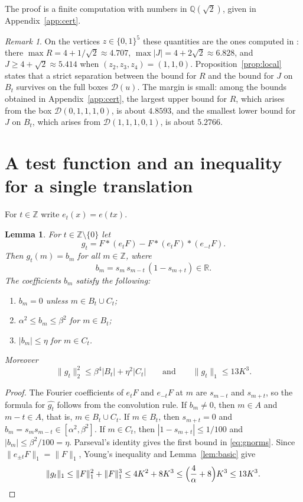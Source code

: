 \documentclass{amsart}
\newtheorem{lemma}[theorem]{Lemma}
\theoremstyle{remark}
\newtheorem{remark}[theorem]{Remark}
\numberwithin{equation}{section}
\numberwithin{table}{section}
\newcommand{\Z}{\mathbb{Z}}
\newcommand{\R}{\mathbb{R}}
\newcommand{\D}{\mathcal{D}}
\begin{document}
The proof is a finite computation with numbers in $\mathbb Q(\sqrt2)$, given in Appendix~\ref{app:cert}.

\begin{remark}
On the vertices $z\in\{0,1\}^5$ these quantities are the ones computed in \cite[Lemma~7.2]{Bed}: there $\max R=4+1/\sqrt2\approx4.707$, $\max|J|=4+2\sqrt2\approx6.828$, and $J\ge4+\sqrt2\approx5.414$ when $(z_2,z_3,z_4)=(1,1,0)$. Proposition~\ref{prop:local} states that a strict separation between the bound for $R$ and the bound for $J$ on $B_t$ survives on the full boxes $\D(u)$. The margin is small: among the bounds obtained in Appendix~\ref{app:cert}, the largest upper bound for $R$, which arises from the box $\D(0,1,1,1,0)$, is about $4.8593$, and the smallest lower bound for $J$ on $B_t$, which arises from $\D(1,1,1,0,1)$, is about $5.2766$.
\end{remark}

\section{A test function and an inequality for a single translation}\label{sec:selector}

For $t\in\Z$ write $e_t(x)=e(tx)$.

\begin{lemma}\label{lem:selector}
For $t\in\Z\setminus\{0\}$ let
\[
g_t=F*(e_tF)-F*(e_tF)*(e_{-t}F).
\]
Then $\widehat{g_t}(m)=b_m$ for all $m\in\Z$, where
\[
b_m=s_m\,s_{m-t}\,(1-s_{m+t})\in\R.
\]
The coefficients $b_m$ satisfy the following:
\begin{enumerate}
\item $b_m=0$ unless $m\in B_t\cup C_t$;
\item $\alpha^2\le b_m\le\beta^2$ for $m\in B_t$;
\item $|b_m|\le\eta$ for $m\in C_t$.
\end{enumerate}
Moreover
\begin{equation}\label{eq:gnorms}
\|g_t\|_2^2\le\beta^4|B_t|+\eta^2|C_t|\qquad\text{and}\qquad\|g_t\|_1\le13K^3.
\end{equation}
\end{lemma}

\begin{proof}
The Fourier coefficients of $e_tF$ and $e_{-t}F$ at $m$ are $s_{m-t}$ and $s_{m+t}$, so the formula for $\widehat{g_t}$ follows from the convolution rule. If $b_m\ne0$, then $m\in A$ and $m-t\in A$, that is, $m\in B_t\cup C_t$. If $m\in B_t$, then $s_{m+t}=0$ and $b_m=s_ms_{m-t}\in[\alpha^2,\beta^2]$. If $m\in C_t$, then $|1-s_{m+t}|\le1/100$ and $|b_m|\le\beta^2/100=\eta$. Parseval's identity gives the first bound in \eqref{eq:gnorms}. Since $\|e_{\pm t}F\|_1=\|F\|_1$, Young's inequality and Lemma~\ref{lem:basic} give
\[
\|g_t\|_1\le\|F\|_1^2+\|F\|_1^3\le4K^2+8K^3\le\Bigl(\frac4\alpha+8\Bigr)K^3\le13K^3.\qedhere
\]
\end{proof}
\end{document}

